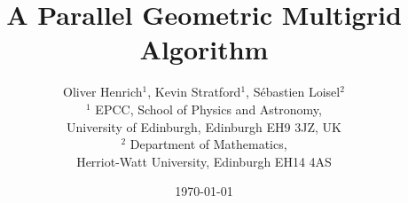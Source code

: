 \documentclass[11pt, oneside, a4paper]{article}
\begin{document}

\title{A Parallel Geometric Multigrid Algorithm}


\author{Oliver Henrich$^1$, Kevin Stratford$^1$, S\'ebastien Loisel$^2$\\
$^1$ EPCC, School of Physics and Astronomy,\\
University of Edinburgh, Edinburgh EH9 3JZ, UK\\
$^2$ Department of Mathematics,\\ 
Herriot-Watt University, Edinburgh EH14 4AS \\
}
\date{\today}



\maketitle
\end{document}
